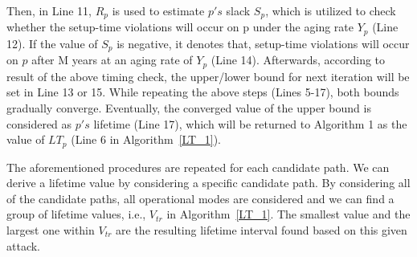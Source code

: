 Then, in Line 11, $R_{p}$ is used to estimate $p's$ slack $S_{p}$, which is utilized to check whether the setup-time violations will occur on p under the aging rate $Y_{p}$ (Line 12). If the value of $S_{p}$ is negative, it denotes that, setup-time violations will occur on $p$ after M years at an aging rate of $Y_{p}$ (Line 14). Afterwards, according to result of the above timing check, the upper/lower bound for next iteration will be set in Line 13 or 15. While repeating the above steps (Lines 5-17), both bounds gradually converge. Eventually, the converged value of the upper bound is considered as $p's$ lifetime (Line 17), which will be returned to Algorithm 1 as the value of $LT_{p}$ (Line 6 in Algorithm~\ref{LT_1}).

The aforementioned procedures are repeated for each candidate path. We can derive a lifetime value by considering a specific candidate path. By considering all of the candidate
paths, all operational modes are considered and we can find a group of lifetime values, i.e., $V_{tr}$ in Algorithm~\ref{LT_1}. The smallest value and the largest one within $V_{tr}$ are the resulting lifetime interval found based on this given attack.
